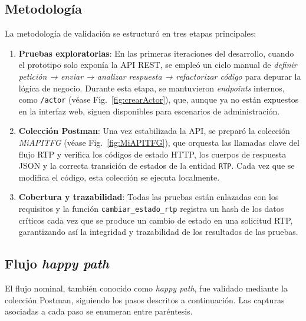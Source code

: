 \subsection{Metodología}

La metodología de validación se estructuró en tres etapas principales:

\begin{enumerate}
  \item \textbf{Pruebas exploratorias}: En las primeras iteraciones del desarrollo, cuando el prototipo solo exponía la API REST, se empleó un ciclo manual de \textit{definir petición → enviar → analizar respuesta → refactorizar código} para depurar la lógica de negocio. Durante esta etapa, se mantuvieron \textit{endpoints} internos, como \texttt{/actor} (véase Fig.~\ref{fig:crearActor}), que, aunque ya no están expuestos en la interfaz web, siguen disponibles para escenarios de administración.
  
  \item \textbf{Colección Postman}: Una vez estabilizada la API, se preparó la colección \textit{MiAPITFG} (véase Fig.~\ref{fig:MiAPITFG}), que orquesta las llamadas clave del flujo RTP y verifica los códigos de estado HTTP, los cuerpos de respuesta JSON y la correcta transición de estados de la entidad \texttt{RTP}. Cada vez que se modifica el código, esta colección se ejecuta localmente.
  
  \item \textbf{Cobertura y trazabilidad}: Todas las pruebas están enlazadas con los requisitos y la función \texttt{cambiar\_estado\_rtp} registra un hash de los datos críticos cada vez que se produce un cambio de estado en una solicitud RTP, garantizando así la integridad y trazabilidad de los resultados de las pruebas.
\end{enumerate}

\subsection{Flujo \textit{happy path}}

El flujo nominal, también conocido como \textit{happy path}, fue validado mediante la colección Postman, siguiendo los pasos descritos a continuación. Las capturas asociadas a cada paso se enumeran entre paréntesis.


